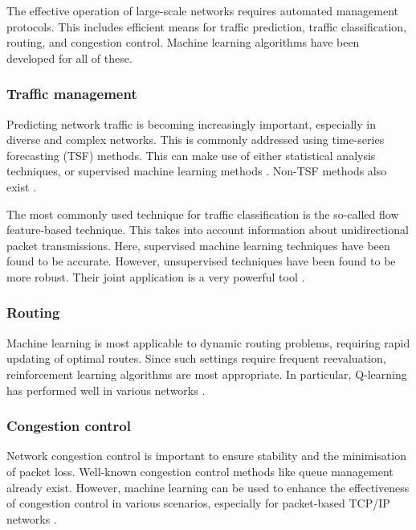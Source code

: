 \documentclass[twocolumn, aps, rmp, amsmath, amssymb, nofootinbib, superscriptaddress, longbibliography, floatfix, table-of-contents, eqsecnum]{revtex4}
\begin{document}
The effective operation of large-scale networks requires automated management protocols. This includes efficient means for traffic prediction, traffic classification, routing, and congestion control. Machine learning algorithms have been developed for all of these.

\subsubsection{Traffic management}

Predicting network traffic is becoming increasingly important, especially in diverse and complex networks. This is commonly addressed using time-series forecasting (TSF) methods. This can make use of either statistical analysis techniques, or supervised machine learning methods \cite{bib:bermolen2009support, bib:chabaa2010identification, bib:cortez2006internet}. Non-TSF methods also exist \cite{bib:chen2016predicting, bib:li2016inter}.

The most commonly used technique for traffic classification is the so-called flow feature-based technique. This takes into account information about unidirectional packet transmissions. Here, supervised machine learning techniques have been found to be accurate. However, unsupervised techniques have been found to be more robust. Their joint application is a very powerful tool \cite{bib:erman2007offline, bib:zhang2015robust}.

\subsubsection{Routing}

Machine learning is most applicable to dynamic routing problems, requiring rapid updating of optimal routes. Since such settings require frequent reevaluation, reinforcement learning algorithms are most appropriate. In particular, Q-learning has performed well in various networks \cite{bib:wang2006adaptive, bib:forster2007froms, arroyo2007q}.

\subsubsection{Congestion control}

Network congestion control is important to ensure stability and the minimisation of packet loss. Well-known congestion control methods like queue management already exist. However, machine learning can be used to enhance the effectiveness of congestion control in various scenarios, especially for packet-based TCP/IP networks \cite{bib:liu2002end, bib:barman2004model, bib:el2005improving}. 
\end{document}
